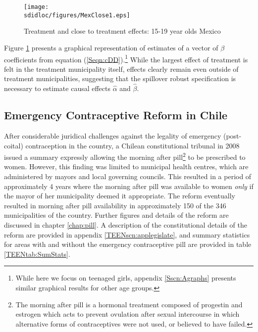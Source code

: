 \begin{figure}[h!]
\texttt{[image: \\sdidloc/figures/MexClose1.eps]}
\caption{Treatment and close to treatment effects: 15-19 year olds Mexico}
\label{SFig:MexClose}
\vspace{2mm}
\end{figure}
Figure \ref{SFig:MexClose} presents a graphical representation of estimates
of a vector of $\beta$ coefficients from equation (\ref{Seqn:cDD}).\footnote{
While here we focus on teenaged girls, appendix \ref{Sscn:Agraphs} presents
similar graphical results for other age groups.}  While the largest effect of 
treatment is felt in the treatment municipality itself, effects clearly remain 
even outside of treatment municipalities, suggesting that the spillover robust 
specification is necessary to estimate causal effects $\hat\alpha$ and 
$\hat\beta$.

\subsection{Emergency Contraceptive Reform in Chile}
After considerable juridical challenges against the legality of emergency 
(post-coital) contraception in the country, a Chilean constitutional tribunal in 
2008 issued a summary expressly allowing the morning after pill\footnote{The 
morning after pill is a hormonal treatment composed of progestin and estrogen 
which acts to prevent ovulation after sexual intercourse in which alternative 
forms of contraceptives were not used, or believed to have failed.} to be 
prescribed to women.  However, this finding was limited to municipal health 
centres, which are administered by mayors and local governing councils.  This
resulted in a period of approximately 4 years where the morning after pill was 
available to women \emph{only} if the mayor of her municipality deemed it 
appropriate.  The reform eventually resulted in morning after pill availability in 
approximately 150 of the 346 municipalities of the country.  Further figures and 
details of the reform are discussed in chapter \ref{chap:pill}.  A description
of the constitutional details of the reform are provided in appendix 
\ref{TEENscn:applegislate}, and summary statistics for areas with and without
the emergency contraceptive pill are provided in table \ref{TEENtab:SumStats}.

